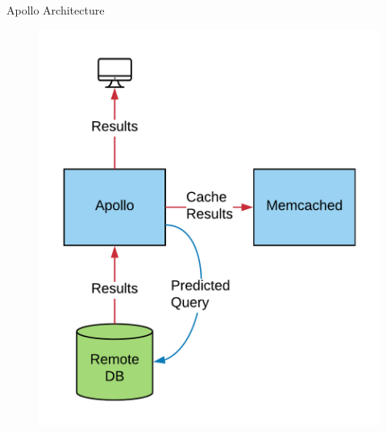 \documentclass[10pt]{beamer}
\begin{document}
\begin{frame}[fragile]{Apollo Architecture}
    \begin{figure}
        \includegraphics[scale=0.17]{apollo_arch_diagram_7}
    \end{figure}
\end{frame}
\end{document}

